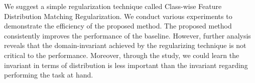 We suggest a simple regularization technique called Class-wise Feature Distribution Matching Regularization. We conduct various experiments to demonstrate the efficiency of the proposed method. The proposed method consistently improves the performance of the baseline. However, further analysis reveals that the domain-invariant achieved by the regularizing technique is not critical to the performance. Moreover, through the study, we could learn the invariant in terms of distribution is less important than the invariant regarding performing the task at hand.